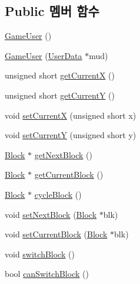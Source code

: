 \subsection*{Public 멤버 함수}
\begin{DoxyCompactItemize}
\item 
\hyperlink{class_tetris_1_1_users_1_1_game_user_af9d7bed8e019ca4348995337ea7339b7}{Game\+User} ()
\item 
\hyperlink{class_tetris_1_1_users_1_1_game_user_a61819671f799d3d6cb2d89e99ffd1714}{Game\+User} (\hyperlink{class_tetris_1_1_users_1_1_user_data}{User\+Data} $\ast$mud)
\item 
unsigned short \hyperlink{class_tetris_1_1_users_1_1_game_user_ad25eace96bd27ae6df4a0c0d506be730}{get\+CurrentX} ()
\item 
unsigned short \hyperlink{class_tetris_1_1_users_1_1_game_user_af5bd7ff0b575af1b42b093488cff97e2}{get\+CurrentY} ()
\item 
void \hyperlink{class_tetris_1_1_users_1_1_game_user_a2957358b1a6298f06c6c2e10cb89f623}{set\+CurrentX} (unsigned short x)
\item 
void \hyperlink{class_tetris_1_1_users_1_1_game_user_aeedbe521004c22018b73a509e99f7d81}{set\+CurrentY} (unsigned short y)
\item 
\hyperlink{class_tetris_1_1_block}{Block} $\ast$ \hyperlink{class_tetris_1_1_users_1_1_game_user_a9300608a38f8a3b10f9d6b6bdaeaab18}{get\+Next\+Block} ()
\item 
\hyperlink{class_tetris_1_1_block}{Block} $\ast$ \hyperlink{class_tetris_1_1_users_1_1_game_user_a3d4bcc74d518c28356012f8a42b85896}{get\+Current\+Block} ()
\item 
\hyperlink{class_tetris_1_1_block}{Block} $\ast$ \hyperlink{class_tetris_1_1_users_1_1_game_user_a5efbd1ed9fa84a4041c218fb32463c36}{cycle\+Block} ()
\item 
void \hyperlink{class_tetris_1_1_users_1_1_game_user_a6249d0f4e9d77edd94935a74bbd298d5}{set\+Next\+Block} (\hyperlink{class_tetris_1_1_block}{Block} $\ast$blk)
\item 
void \hyperlink{class_tetris_1_1_users_1_1_game_user_ae1743f8024d25ed74d7b2e456907ee41}{set\+Current\+Block} (\hyperlink{class_tetris_1_1_block}{Block} $\ast$blk)
\item 
void \hyperlink{class_tetris_1_1_users_1_1_game_user_a1d1efa857420c82248fd12da9c08ef77}{switch\+Block} ()
\item 
bool \hyperlink{class_tetris_1_1_users_1_1_game_user_a8a777ef1ffbbc53ebae4172830863eb4}{can\+Switch\+Block} ()

\end{DoxyCompactItemize}
